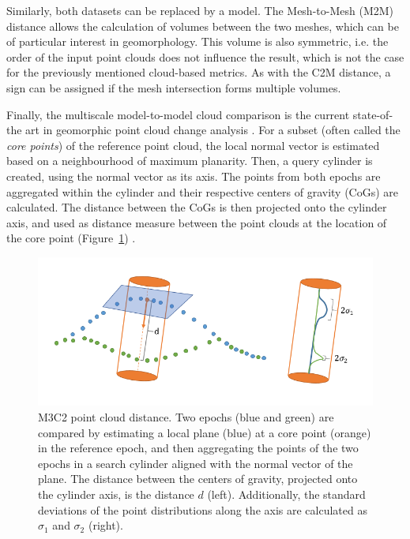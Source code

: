 \documentclass[preprint,12pt,3p]{elsarticle}
\begin{document}
Similarly, both datasets can be replaced by a model. The Mesh-to-Mesh (M2M) distance allows the calculation of volumes between the two meshes, which can be of particular interest in geomorphology. This volume is also symmetric, i.e. the order of the input point clouds does not influence the result, which is not the case for the previously mentioned cloud-based metrics. As with the C2M distance, a sign can be assigned if the mesh intersection forms multiple volumes.

Finally, the multiscale model-to-model cloud comparison \citep[M3C2,][]{Lague2013} is the current state-of-the art in geomorphic point cloud change analysis \citep{Zahs2019}. For a subset (often called the \emph{core points}) of the reference point cloud, the local normal vector is estimated based on a neighbourhood of maximum planarity. Then, a query cylinder is created, using the normal vector as its axis. The points from both epochs are aggregated within the cylinder and their respective centers of gravity (CoGs) are calculated. The distance between the CoGs is then projected onto the cylinder axis, and used as distance measure between the point clouds at the location of the core point (Figure~\ref{fig:m3c2}) \citep{Lague2013}.

\begin{figure}
    \centering
    \includegraphics[width=0.9\linewidth]{figs/m3c2.png}
    \caption{M3C2 point cloud distance. Two epochs (blue and green) are compared by estimating a local plane (blue) at a core point (orange) in the reference epoch, and then aggregating the points of the two epochs in a search cylinder aligned with the normal vector of the plane. The distance between the centers of gravity, projected onto the cylinder axis, is the distance $d$ (left). Additionally, the standard deviations of the point distributions along the axis are calculated as $\sigma_1$ and $\sigma_2$ (right).}
    \label{fig:m3c2}
\end{figure}
\end{document}
